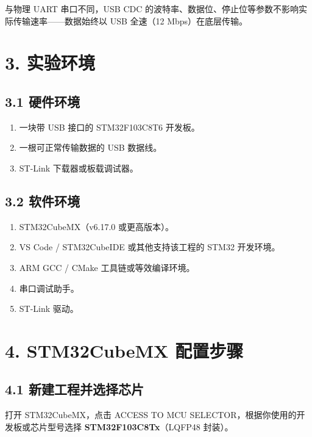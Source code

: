 \documentclass[
  chinese,
  UTF8,
  oneside,
  openany]{ctexbook}
\providecommand{\tightlist}{%
  \setlength{\itemsep}{0pt}\setlength{\parskip}{0pt}}
\begin{document}
与物理 UART 串口不同，USB CDC
的波特率、数据位、停止位等参数不影响实际传输速率------数据始终以 USB
全速（12 Mbps）在底层传输。

\section{3. 实验环境}\label{ux5b9eux9a8cux73afux5883-1}

\subsection{3.1 硬件环境}\label{ux786cux4ef6ux73afux5883-1}

\begin{enumerate}
\def\labelenumi{\arabic{enumi}.}
\tightlist
\item
  一块带 USB 接口的 STM32F103C8T6 开发板。
\item
  一根可正常传输数据的 USB 数据线。
\item
  ST-Link 下载器或板载调试器。
\end{enumerate}

\subsection{3.2 软件环境}\label{ux8f6fux4ef6ux73afux5883-1}

\begin{enumerate}
\def\labelenumi{\arabic{enumi}.}
\tightlist
\item
  STM32CubeMX（v6.17.0 或更高版本）。
\item
  VS Code / STM32CubeIDE 或其他支持该工程的 STM32 开发环境。
\item
  ARM GCC / CMake 工具链或等效编译环境。
\item
  串口调试助手。
\item
  ST-Link 驱动。
\end{enumerate}

\section{4. STM32CubeMX
配置步骤}\label{stm32cubemx-ux914dux7f6eux6b65ux9aa4-6}

\subsection{4.1
新建工程并选择芯片}\label{ux65b0ux5efaux5de5ux7a0bux5e76ux9009ux62e9ux82afux7247-1}

打开 STM32CubeMX，点击 ACCESS TO MCU
SELECTOR，根据你使用的开发板或芯片型号选择
\textbf{STM32F103C8Tx}（LQFP48 封装）。
\end{document}
